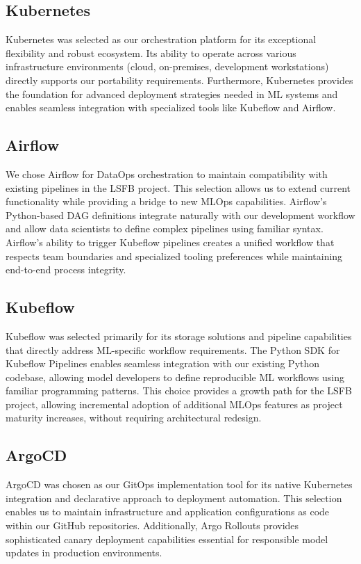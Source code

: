\subsection{Kubernetes}\label{subsec:kubernetes}
Kubernetes was selected as our orchestration platform for its exceptional flexibility and robust ecosystem.
Its ability to operate across various infrastructure environments (cloud, on-premises, development workstations) directly supports our portability requirements.
Furthermore, Kubernetes provides the foundation for advanced deployment strategies needed in ML systems and enables seamless integration with specialized tools like Kubeflow and Airflow.


\subsection{Airflow}\label{subsec:airflow}
We chose Airflow for DataOps orchestration to maintain compatibility with existing pipelines in the LSFB project.
This selection allows us to extend current functionality while providing a bridge to new MLOps capabilities.
Airflow's Python-based DAG definitions integrate naturally with our development workflow and allow data scientists to define complex pipelines using familiar syntax.
Airflow's ability to trigger Kubeflow pipelines creates a unified workflow that respects team boundaries and specialized tooling preferences while maintaining end-to-end process integrity.

\subsection{Kubeflow}\label{subsec:kubeflow}
Kubeflow was selected primarily for its storage solutions and pipeline capabilities that directly address ML-specific workflow requirements.
The Python SDK for Kubeflow Pipelines enables seamless integration with our existing Python codebase, allowing model developers to define reproducible ML workflows using familiar programming patterns.
This choice provides a growth path for the LSFB project, allowing incremental adoption of additional MLOps features as project maturity increases, without requiring architectural redesign.

\subsection{ArgoCD}\label{subsec:argocd}
ArgoCD was chosen as our GitOps implementation tool for its native Kubernetes integration and declarative approach to deployment automation.
This selection enables us to maintain infrastructure and application configurations as code within our GitHub repositories.
Additionally, Argo Rollouts provides sophisticated canary deployment capabilities essential for responsible model updates in production environments.

